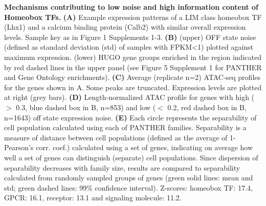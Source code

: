 \textbf{Mechanisms contributing to low noise and high information content of Homeobox TFs.} \textbf{(A)} Example expression patterns of a LIM class homeobox TF (Lhx1) and a calcium binding protein (Calb2) with similar overall expression levels. Sample key as in Figure 1 Supplements 1-3. \textbf{(B)} (upper) OFF state noise (defined as standard deviation (std) of samples with FPKM<1) plotted against maximum expression. (lower) HUGO gene groups enriched in the region indicated by red dashed lines in the upper panel (see Figure 5 Supplement 1 for PANTHER and Gene Ontology enrichments). \textbf{(C)} Average (replicate n=2) ATAC-seq profiles for the genes shown in A. Some peaks are truncated. Expression levels are plotted at right (grey bars). \textbf{(D)} Length-normalized ATAC profile for genes with high ($>$ 0.3, blue dashed box in B, n=853) and low ($<$ 0.2, red dashed box in B, n=1643) off state expression noise. \textbf{(E)} Each circle represents the separability of cell population calculated using each of PANTHER families. Separability is a measure of distance between cell populations (defined as the average of 1- Pearson’s corr. coef.) calculated using a set of genes, indicating on average how well a set of genes can distinguish (separate) cell populations. Since dispersion of separability decreases with family size, results are compared to separability calculated from randomly sampled groups of genes (green solid lines: mean and std; green dashed lines: 99\% confidence interval). Z-scores: homeobox TF: 17.4, GPCR: 16.1, receptor: 13.1 and signaling molecule: 11.2.